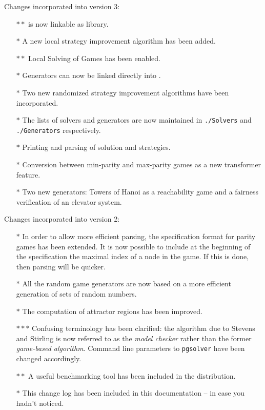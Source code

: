 Changes incorporated into version 3:
\begin{itemize}
\item[$\ast\ast$] \pgsolver is now linkable as library.
\item[$\ast$] A new local strategy improvement algorithm has been added.
\item[$\ast\ast$] Local Solving of Games has been enabled.
\item[$\ast$] Generators can now be linked directly into \pgsolver.
\item[$\ast$] Two new randomized strategy improvement algorithms have been incorporated.
\item[$\ast$] The lists of solvers and generators are now maintained in \texttt{./Solvers} and \texttt{./Generators} respectively.
\item[$\ast$] Printing and parsing of solution and strategies.
\item[$\ast$] Conversion between min-parity and max-parity games as a new transformer feature.
\item[$\ast$] Two new generators: Towers of Hanoi as a reachability game and a fairness verification of an elevator system.
\end{itemize} 



Changes incorporated into version 2:
\begin{itemize}
\item[$\ast$] In order to allow more efficient parsing, the specification format for parity
      games has been extended. It is now possible to include at the beginning of the specification
      the maximal index of a node in the game. If this is done, then parsing will be quicker.
\item[$\ast$] All the random game generators are now based on a more efficient generation
      of sets of random numbers.
\item[$\ast$] The computation of attractor regions has been improved.
\item[$\ast\ast\ast$] Confusing terminology has been clarified: the algorithm due to Stevens and
     Stirling \cite{StevensStirling98} is now referred to as the \emph{model checker} rather than the 
     former \emph{game-based algorithm}. Command line parameters to \texttt{pgsolver} have been 
     changed accordingly.
\item[$\ast\ast$] A useful benchmarking tool has been included in the distribution.
\item[$\ast$] This change log has been included in this documentation -- in case you hadn't noticed.
\end{itemize} 

 

